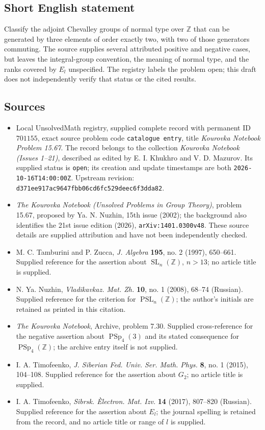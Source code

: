 \documentclass[11pt]{article}
\newcommand{\Z}{\mathbb{Z}}
\begin{document}
\subsection{Short English statement}
Classify the adjoint Chevalley groups of normal type over \(\Z\) that can be generated by three elements of order exactly two, with two of those generators commuting. The source supplies several attributed positive and negative cases, but leaves the integral-group convention, the meaning of normal type, and the ranks covered by \(E_l\) unspecified. The registry labels the problem open; this draft does not independently verify that status or the cited results.
\subsection{Sources}
\begin{itemize}
\item Local UnsolvedMath registry, supplied complete record with permanent ID \(701155\), exact source problem code \texttt{catalogue entry}, title \emph{Kourovka Notebook Problem 15.67}. The record belongs to the collection \emph{Kourovka Notebook (Issues 1--21)}, described as edited by E. I. Khukhro and V. D. Mazurov. Its supplied status is \texttt{open}; its creation and update timestamps are both \texttt{2026-10-16T14:00:00Z}. Upstream revision: \texttt{d371ee917ac9647fbb06cd6fc529deec6f3dda82}.
\item \emph{The Kourovka Notebook (Unsolved Problems in Group Theory)}, problem 15.67, proposed by Ya. N. Nuzhin, 15th issue (2002); the background also identifies the 21st issue edition (2026), \texttt{arXiv:1401.0300v48}. These source details are supplied attribution and have not been independently checked.
\item M. C. Tamburini and P. Zucca, \emph{J. Algebra} \textbf{195}, no. 2 (1997), 650--661. Supplied reference for the assertion about \(\operatorname{SL}_n(\Z)\), \(n>13\); no article title is supplied.
\item N. Ya. Nuzhin, \emph{Vladikavkaz. Mat. Zh.} \textbf{10}, no. 1 (2008), 68--74 (Russian). Supplied reference for the criterion for \(\operatorname{PSL}_n(\Z)\); the author's initials are retained as printed in this citation.
\item \emph{The Kourovka Notebook}, Archive, problem 7.30. Supplied cross-reference for the negative assertion about \(\operatorname{PSp}_4(3)\) and its stated consequence for \(\operatorname{PSp}_4(\Z)\); the archive entry itself is not supplied.
\item I. A. Timofeenko, \emph{J. Siberian Fed. Univ. Ser. Math. Phys.} \textbf{8}, no. 1 (2015), 104--108. Supplied reference for the assertion about \(G_2\); no article title is supplied.
\item I. A. Timofeenko, \emph{Sibrsk. \`Electron. Mat. Izv.} \textbf{14} (2017), 807--820 (Russian). Supplied reference for the assertion about \(E_l\); the journal spelling is retained from the record, and no article title or range of \(l\) is supplied.
\end{itemize}
\end{document}
